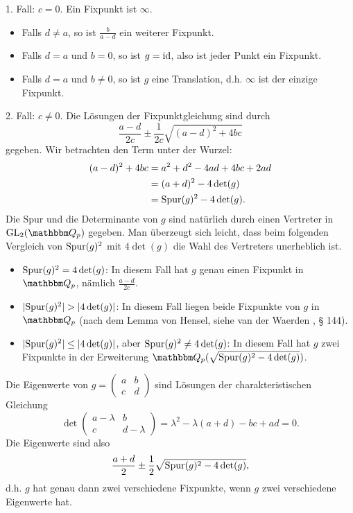 \documentclass[a4paper, 12pt, twoside]{article}
\begin{document}
1. Fall: $c=0$. Ein Fixpunkt ist $\infty$.
\begin{itemize}
\item Falls $d\neq a$, so ist $\frac{b}{a-d}$ ein weiterer Fixpunkt.
\item Falls $d=a$ und $b=0$, so ist $g=\mathrm{id}$, also ist jeder
Punkt ein Fixpunkt.
\item Falls $d=a$ und $b\neq 0$, so ist $g$ eine Translation,
d.h. $\infty$ ist der einzige Fixpunkt.
\end{itemize}

2. Fall: $c\neq 0$. Die Lösungen der Fixpunktgleichung sind
durch
\[
\frac{a-d}{2c}\pm \frac{1}{2c}\sqrt{(a-d)^2+4bc}
\]
gegeben. Wir betrachten den Term unter der Wurzel:
\begin{align*}
(a-d)^2+4bc &= a^2+d^2-4ad+4bc+2ad \\
&= (a+d)^2 - 4 \det(g) \\
&=\mathrm{Spur}(g)^2 - 4 \det(g).
\end{align*}
Die Spur und die Determinante von $g$ sind natürlich durch einen
Vertreter in $\GL_2(\QQ_p)$ gegeben.
Man überzeugt sich leicht, dass beim folgenden
Vergleich von $\mathrm{Spur}(g)^2$ mit $4\det(g)$ die Wahl des
Vertreters unerheblich ist.
\begin{itemize}
\item $\mathrm{Spur}(g)^2=4\det(g)$: In diesem Fall hat $g$
genau einen Fixpunkt in $\QQ_p$, nämlich $\frac{a-d}{2c}$.
\item $|\spur(g)^2|>|4\det(g)|$: In diesem Fall liegen
beide Fixpunkte von $g$ in $\QQ_p$ (nach dem Lemma von Hensel,
siehe van der Waerden \cite{vdW}, § 144).
\item $|\mathrm{Spur}(g)^2|\leq|4\det(g)|$, aber
$\mathrm{Spur}(g)^2\neq 4\det(g)$: In diesem Fall hat $g$
zwei Fixpunkte in der Erweiterung
$\QQ_p(\sqrt{\spur(g)^2-4\det(g)})$.
\end{itemize}

\BEM Die Eigenwerte von
$g=\begin{pmatrix}a&b\\ c&d\end{pmatrix}$
sind Lösungen der charakteristischen Gleichung
\[
\det
\begin{pmatrix}a-\lambda&b\\ c&d-\lambda\end{pmatrix}
=
\lambda^2 - \lambda(a+d) - bc + ad = 0.
\]
Die Eigenwerte sind also
\[
\frac{a+d}{2} \pm \frac{1}{2}\sqrt{\mathrm{Spur}(g)^2 - 4\det(g)},
\]
d.h. $g$ hat genau dann zwei verschiedene Fixpunkte,
wenn $g$ zwei verschiedene Eigenwerte hat.
\end{document}
